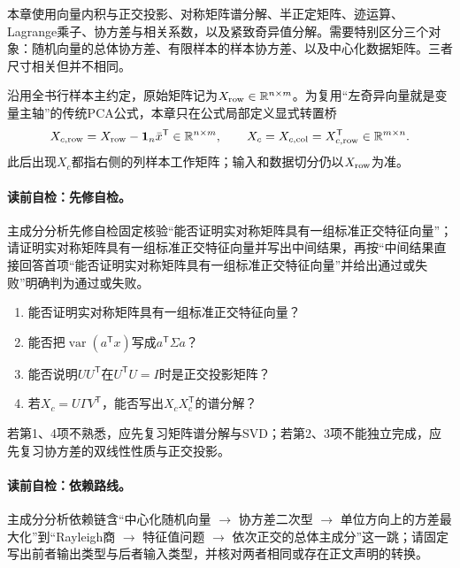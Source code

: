\begin{prerequisitebox}
本章使用向量内积与正交投影、对称矩阵谱分解、半正定矩阵、迹运算、Lagrange乘子、协方差与相关系数，以及紧致奇异值分解。需要特别区分三个对象：随机向量的总体协方差、有限样本的样本协方差、以及中心化数据矩阵。三者尺寸相关但并不相同。

沿用全书行样本主约定，原始矩阵记为$X_{\rm row}\in\mathbb R^{n\times m}$。为复用“左奇异向量就是变量主轴”的传统PCA公式，本章只在公式局部定义显式转置桥
\[
X_{c,{\rm row}}=X_{\rm row}-\boldsymbol1_n\bar x^{\mathsf T}\in\mathbb R^{n\times m},
\qquad
X_c=X_{c,{\rm col}}=X_{c,{\rm row}}^{\mathsf T}\in\mathbb R^{m\times n}.
\]
此后出现$X_c$都指右侧的列样本工作矩阵；输入和数据切分仍以$X_{\rm row}$为准。
\end{prerequisitebox}

\label{struct:V4-C04-CH03}
\paragraph{读前自检：先修自检。}主成分分析先修自检固定核验“能否证明实对称矩阵具有一组标准正交特征向量”；请证明实对称矩阵具有一组标准正交特征向量并写出中间结果，再按“中间结果直接回答首项“能否证明实对称矩阵具有一组标准正交特征向量”并给出通过或失败”明确判为通过或失败。\par

\begin{precheckbox}
\begin{enumerate}[leftmargin=2.2em,itemsep=0.08em]
  \item 能否证明实对称矩阵具有一组标准正交特征向量？
  \item 能否把$\operatorname{var}(a^{\mathsf T}x)$写成$a^{\mathsf T}\Sigma a$？
  \item 能否说明$UU^{\mathsf T}$在$U^{\mathsf T}U=I$时是正交投影矩阵？
  \item 若$X_c=U\Gamma V^{\mathsf T}$，能否写出$X_cX_c^{\mathsf T}$的谱分解？
\end{enumerate}
若第1、4项不熟悉，应先复习矩阵谱分解与SVD；若第2、3项不能独立完成，应先复习协方差的双线性性质与正交投影。
\end{precheckbox}

\label{struct:V4-C04-CH04}
\paragraph{读前自检：依赖路线。}主成分分析依赖链含“中心化随机向量 $\to$ 协方差二次型 $\to$ 单位方向上的方差最大化”到“Rayleigh商 $\to$ 特征值问题 $\to$ 依次正交的总体主成分”这一跳；请固定写出前者输出类型与后者输入类型，并核对两者相同或存在正文声明的转换。\par

